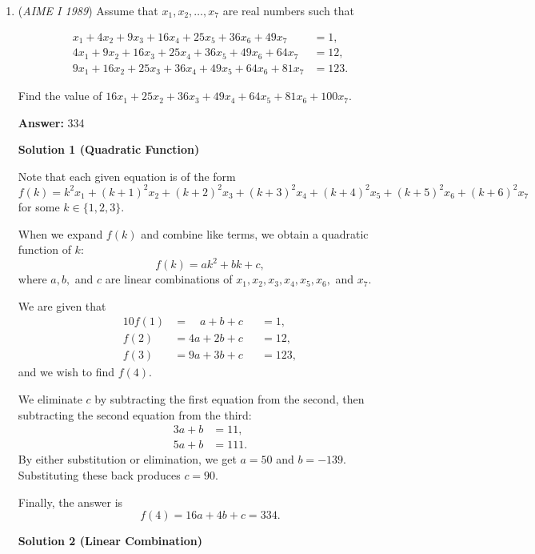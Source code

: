 \begin{enumerate}
 


	\item (\textit{AIME I 1989}) Assume that $x_1,x_2,\ldots,x_7$ are real numbers such that

 \begin{align*} x_1 + 4x_2 + 9x_3 + 16x_4 + 25x_5 + 36x_6 + 49x_7 &= 1, \\ 4x_1 + 9x_2 + 16x_3 + 25x_4 + 36x_5 + 49x_6 + 64x_7 &= 12, \\ 9x_1 + 16x_2 + 25x_3 + 36x_4 + 49x_5 + 64x_6 + 81x_7 &= 123. \end{align*}

Find the value of $16x_1+25x_2+36x_3+49x_4+64x_5+81x_6+100x_7$.


 
 \textbf{Answer: }334



\textbf{Solution 1 (Quadratic Function)}

Note that each given equation is of the form 
 \[f(k)=k^2x_1+(k+1)^2x_2+(k+2)^2x_3+(k+3)^2x_4+(k+4)^2x_5+(k+5)^2x_6+(k+6)^2x_7\] for some $k\in\{1,2,3\}.$

 When we expand $f(k)$ and combine like terms, we obtain a quadratic function of $k:$ 
 \[f(k)=ak^2+bk+c,\] where $a,b,$ and $c$ are linear combinations of $x_1,x_2,x_3,x_4,x_5,x_6,$ and $x_7.$ 

 We are given that
 \begin{alignat*}{10} f(1)&=\phantom{42}a+b+c&&=1, \\ f(2)&=4a+2b+c&&=12, \\ f(3)&=9a+3b+c&&=123, \end{alignat*}and we wish to find $f(4).$

 We eliminate $c$ by subtracting the first equation from the second, then subtracting the second equation from the third:
 \begin{align*} 3a+b&=11, \\ 5a+b&=111. \end{align*}
By either substitution or elimination, we get $a=50$ and $b=-139.$ Substituting these back produces $c=90.$

 Finally, the answer is 
 \[f(4)=16a+4b+c=\boxed{334}.\]




\textbf{Solution 2 (Linear Combination)}


\end{enumerate}
